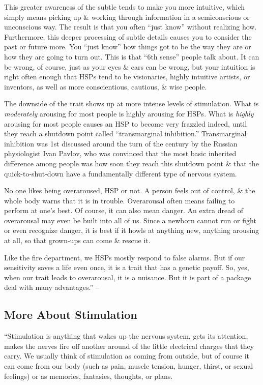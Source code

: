 \documentclass{article}
\numberwithin{equation}{section}
\begin{document}
This greater awareness of the subtle tends to make you more intuitive, which simply means picking up \& working through information in a semiconscious or unconscious way. The result is that you often ``just know'' without realizing how. Furthermore, this deeper processing of subtle details causes you to consider the past or future more. You ``just know'' how things got to be the way they are or how they are going to turn out. This is that ``6th sense'' people talk about. It can be wrong, of course, just as your eyes \& ears can be wrong, but your intuition is right often enough that HSPs tend to be visionaries, highly intuitive artists, or inventors, as well as more conscientious, cautious, \& wise people.

The downside of the trait shows up at more intense levels of stimulation. What is \textit{moderately} arousing for most people is highly arousing for HSPs. What is \textit{highly} arousing for most people causes an HSP to become very frazzled indeed, until they reach a shutdown point called ``transmarginal inhibition.'' Transmarginal inhibition was 1st discussed around the turn of the century by the Russian physiologist Ivan Pavlov, who was convinced that the most basic inherited difference among people was how soon they reach this shutdown point \& that the quick-to-shut-down have a fundamentally different type of nervous system.

No one likes being overaroused, HSP or not. A person feels out of control, \& the whole body warns that it is in trouble. Overarousal often means failing to perform at one's best. Of course, it can also mean danger. An extra dread of overarousal may even be built into all of us. Since a newborn cannot run or fight or even recognize danger, it is best if it howls at anything new, anything arousing at all, so that grown-ups can come \& rescue it.

Like the fire department, we HSPs mostly respond to false alarms. But if our sensitivity saves a life even once, it is a trait that has a genetic payoff. So, yes, when our trait leads to overarousal, it is a nuisance. But it is part of a package deal with many advantages.'' -- \cite[pp. 41--42]{Aron2013}

\subsection{More About Stimulation}
``Stimulation is anything that wakes up the nervous system, gets its attention, makes the nerves fire off another around of the little electrical charges that they carry. We usually think of stimulation as coming from outside, but of course it can come from our body (such as pain, muscle tension, hunger, thirst, or sexual feelings) or as memories, fantasies, thoughts, or plans.
\end{document}
